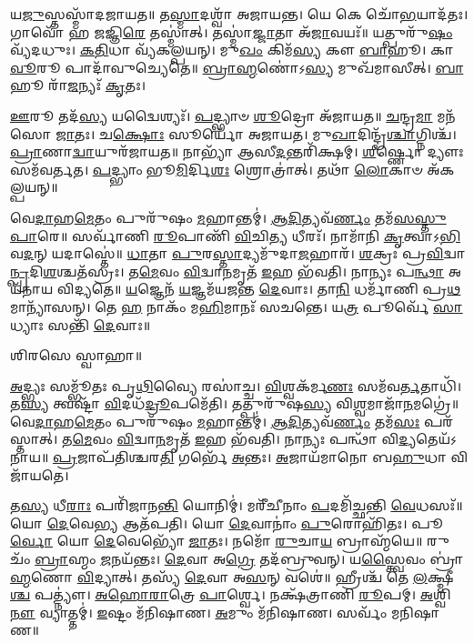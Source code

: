 𑌯\-\ul{𑌜𑍁}\-𑌸𑍍𑌤𑌸𑍍𑌮𑌾᳴𑌦𑌜𑌾𑌯𑌤॥ 𑌤\-\ul{𑌸𑍍𑌮𑌾}\-𑌦𑌶𑍍𑌵𑌾᳴ 𑌅𑌜𑌾𑌯𑌨𑍍𑌤। 𑌯𑍇 𑌕𑍇 𑌚𑍋᳴\-\ul{𑌭}\-𑌯𑌾𑌦᳴𑌤𑌃। 𑌗𑌾𑌵𑍋᳴ 𑌹 𑌜𑌜𑍍𑌞𑌿\-\ul{𑌰𑍇} 𑌤𑌸𑍍𑌮𑌾॑𑌤𑍍। 𑌤𑌸𑍍𑌮𑌾॑\-\ul{𑌜𑍍𑌜𑌾}\-𑌤𑌾 𑌅᳴\-\ul{𑌜𑌾}\-𑌵𑌯𑌃᳴॥ 𑌯𑌤𑍍𑌪𑍁𑌰𑍁᳴\-\ul{𑌷𑌂} 𑌵𑍍𑌯᳴𑌦𑌧𑍁𑌃। \ul{𑌕}\-\-\ul{𑌤𑌿}\-𑌧𑌾 𑌵𑍍𑌯᳴𑌕𑌲𑍍𑌪𑌯𑌨𑍍। 𑌮𑍁\-\ul{𑌖𑌂} 𑌕𑌿𑌮᳴\-\ul{𑌸𑍍𑌯} 𑌕𑍗 \ul{𑌬𑌾}\-𑌹𑍂। 𑌕𑌾\-\ul{𑌵𑍂}\-𑌰𑍂 𑌪𑌾𑌦𑌾᳴𑌵𑍁𑌚𑍍𑌯𑍇𑌤𑍇॥ \ul{𑌬𑍍𑌰𑌾}\-\-\ul{𑌹𑍍𑌮}\-𑌣𑍋॑𑌽\-\ul{𑌸𑍍𑌯} 𑌮𑍁𑌖᳴𑌮𑌾𑌸𑍀𑌤𑍍। \ul{𑌬𑌾}\-𑌹𑍂 𑌰𑌾᳴\-\ul{𑌜}\-𑌨𑍍𑌯𑌃᳴ \ul{𑌕𑍃}\-𑌤𑌃।

 \ul{𑌊}\-𑌰𑍂 𑌤𑌦᳴\-\ul{𑌸𑍍𑌯} 𑌯𑌦𑍍𑌵𑍈𑌶𑍍𑌯𑌃᳴। \ul{𑌪}\-𑌦𑍍𑌭𑍍𑌯𑌾𑍞 \ul{𑌶𑍂}\-𑌦𑍍𑌰𑍋 𑌅᳴𑌜𑌾𑌯𑌤॥ \ul{𑌚}\-𑌨𑍍𑌦𑍍𑌰\-\ul{𑌮𑌾} 𑌮𑌨᳴𑌸𑍋 \ul{𑌜𑌾}\-𑌤𑌃। 𑌚\-\ul{𑌕𑍍𑌷𑍋𑌃} 𑌸𑍂𑌰𑍍𑌯𑍋᳴ 𑌅𑌜𑌾𑌯𑌤। 𑌮𑍁\-\ul{𑌖𑌾}\-𑌦𑌿𑌨𑍍𑌦𑍍𑌰᳴\-\ul{𑌶𑍍𑌚𑌾}\-𑌗𑍍𑌨𑌿𑌶𑍍𑌚᳴। \ul{𑌪𑍍𑌰𑌾}\-𑌣𑌾\-\ul{𑌦𑍍𑌵𑌾}\-𑌯𑍁𑌰᳴𑌜𑌾𑌯𑌤॥ 𑌨𑌾𑌭𑍍𑌯𑌾᳴ 𑌆𑌸𑍀\-\ul{𑌦}\-𑌨𑍍𑌤𑌰𑌿᳴𑌕𑍍𑌷𑌮𑍍। \ul{𑌶𑍀}\-𑌰𑍍𑌷𑍍𑌣𑍋 𑌦𑍍𑌯𑍗𑌃 𑌸𑌮᳴𑌵𑌰𑍍𑌤𑌤। \ul{𑌪}\-𑌦𑍍𑌭𑍍𑌯𑌾𑌂 𑌭𑍂\-\ul{𑌮𑌿}\-𑌰𑍍𑌦𑌿\-\ul{𑌶𑌃} 𑌶𑍍𑌰𑍋𑌤𑍍𑌰𑌾॑𑌤𑍍। 𑌤𑌥𑌾᳴ \ul{𑌲𑍋}\-𑌕𑌾𑍞 𑌅᳴𑌕𑌲𑍍𑌪𑌯𑌨𑍍॥

 𑌵𑍇\-\ul{𑌦𑌾}\-𑌹\-\ul{𑌮𑍇}\-𑌤𑌂 𑌪𑍁𑌰𑍁᳴𑌷𑌂 \ul{𑌮}\-𑌹𑌾𑌨𑍍𑌤𑌮𑍍॑। \ul{𑌆}\-\-\ul{𑌦𑌿}\-𑌤𑍍𑌯𑌵᳴\-\ul{𑌰𑍍𑌣𑌂} 𑌤𑌮᳴\-\ul{𑌸}\-\-\ul{𑌸𑍍𑌤𑍁} \ul{𑌪𑌾}\-𑌰𑍇॥ 𑌸𑌰𑍍𑌵𑌾᳴𑌣𑌿 \ul{𑌰𑍂}\-𑌪𑌾𑌣𑌿᳴ \ul{𑌵𑌿}\-𑌚𑌿\-\ul{𑌤𑍍𑌯} 𑌧𑍀𑌰𑌃᳴। 𑌨𑌾𑌮𑌾᳴𑌨𑌿 \ul{𑌕𑍃}\-𑌤𑍍𑌵𑌾𑌽\-\ul{𑌭𑌿}\-𑌵\-\ul{𑌦}\-𑌨𑍍 𑌯𑌦𑌾𑌸𑍍𑌤𑍇॑॥ \ul{𑌧𑌾}\-𑌤𑌾 \ul{𑌪𑍁}\-𑌰\-\ul{𑌸𑍍𑌤𑌾}\-𑌦𑍍𑌯𑌮𑍁᳴𑌦𑌾\-\ul{𑌜}\-𑌹𑌾𑌰᳴। \ul{𑌶}\-𑌕𑍍𑌰𑌃 𑌪𑍍𑌰\-\ul{𑌵𑌿}\-𑌦𑍍𑌵𑌾\-\ul{𑌨𑍍𑌪𑍍𑌰}\-𑌦𑌿\-\ul{𑌶}\-𑌶𑍍𑌚𑌤᳴𑌸𑍍𑌰𑌃। 𑌤\-\ul{𑌮𑍇}\-𑌵𑌂 \ul{𑌵𑌿}\-𑌦𑍍𑌵𑌾\-\ul{𑌨}\-𑌮𑍃𑌤᳴ \ul{𑌇}\-𑌹 𑌭᳴𑌵𑌤𑌿। 𑌨𑌾𑌨𑍍𑌯𑌃 𑌪\-\ul{𑌨𑍍𑌥𑌾} 𑌅𑌯᳴𑌨𑌾𑌯 𑌵𑌿𑌦𑍍𑌯𑌤𑍇॥ \ul{𑌯}\-𑌜𑍍𑌞𑍇𑌨᳴ \ul{𑌯}\-𑌜𑍍𑌞𑌮᳴𑌯𑌜𑌨𑍍𑌤 \ul{𑌦𑍇}\-𑌵𑌾𑌃। 𑌤𑌾\-\ul{𑌨𑌿} 𑌧𑌰𑍍𑌮𑌾᳴𑌣𑌿 𑌪𑍍𑌰\-\ul{𑌥}\-𑌮𑌾𑌨𑍍𑌯𑌾᳴𑌸𑌨𑍍। 𑌤𑍇 \ul{𑌹} 𑌨𑌾𑌕𑌂᳴ 𑌮\-\ul{𑌹𑌿}\-𑌮𑌾𑌨𑌃᳴ 𑌸𑌚𑌨𑍍𑌤𑍇। 𑌯\-\ul{𑌤𑍍𑌰} 𑌪𑍂𑌰𑍍𑌵𑍇᳴ \ul{𑌸𑌾}\-𑌧𑍍𑌯𑌾𑌃 𑌸𑌨𑍍𑌤𑌿᳴ \ul{𑌦𑍇}\-𑌵𑌾𑌃॥ 

𑌶𑌿𑌰𑌸𑍇 𑌸𑍍𑌵𑌾𑌹𑌾॥

{\small \closesection}


\-\ul{𑌅}\-𑌦𑍍𑌭𑍍𑌯𑌃 𑌸𑌮𑍍𑌭𑍂᳴𑌤𑌃 𑌪𑍃\-\ul{𑌥𑌿}\-𑌵𑍍𑌯𑍈 𑌰𑌸𑌾॑𑌚𑍍𑌚। \ul{𑌵𑌿}\-𑌶𑍍𑌵𑌕᳴𑌰𑍍𑌮\-\ul{𑌣𑌃} 𑌸𑌮᳴𑌵\-\ul{𑌰𑍍𑌤}\-𑌤𑌾𑌧𑌿᳴। 𑌤\-\ul{𑌸𑍍𑌯} 𑌤𑍍𑌵𑌷𑍍𑌟𑌾᳴ \ul{𑌵𑌿}\-𑌦𑌧᳴\-\ul{𑌦𑍍𑌰𑍂}\-𑌪𑌮𑍇᳴𑌤𑌿। 𑌤𑌤𑍍𑌪𑍁𑌰𑍁᳴𑌷\-\ul{𑌸𑍍𑌯} 𑌵𑌿\-\ul{𑌶𑍍𑌵}\-𑌮𑌾𑌜𑌾᳴\-\ul{𑌨}\-𑌮𑌗𑍍𑌰𑍇॑॥ 𑌵𑍇\-\ul{𑌦𑌾}\-𑌹\-\ul{𑌮𑍇}\-𑌤𑌂 𑌪𑍁𑌰𑍁᳴𑌷𑌂 \ul{𑌮}\-𑌹𑌾𑌨𑍍𑌤𑌮𑍍॑। \ul{𑌆}\-\-\ul{𑌦𑌿}\-𑌤𑍍𑌯𑌵᳴\-\ul{𑌰𑍍𑌣𑌂} 𑌤𑌮᳴\-\ul{𑌸𑌃} 𑌪𑌰᳴𑌸𑍍𑌤𑌾𑌤𑍍। 𑌤\-\ul{𑌮𑍇}\-𑌵𑌂 \ul{𑌵𑌿}\-𑌦𑍍𑌵𑌾\-\ul{𑌨}\-𑌮𑍃𑌤᳴ \ul{𑌇}\-𑌹 𑌭᳴𑌵𑌤𑌿। 𑌨𑌾𑌨𑍍𑌯𑌃 𑌪𑌨𑍍𑌥𑌾᳴ 𑌵𑌿\-\ul{𑌦𑍍𑌯}\-𑌤𑍇𑌯᳴𑌽𑌨𑌾𑌯॥ \ul{𑌪𑍍𑌰}\-𑌜𑌾𑌪᳴𑌤𑌿𑌶𑍍𑌚𑌰\-\ul{𑌤𑌿} 𑌗𑌰𑍍𑌭𑍇᳴ \ul{𑌅}\-𑌨𑍍𑌤𑌃। \ul{𑌅}\-𑌜𑌾𑌯᳴𑌮𑌾𑌨𑍋 𑌬\-\ul{𑌹𑍁}\-𑌧𑌾 𑌵𑌿𑌜𑌾᳴𑌯𑌤𑍇। 

𑌤\-\ul{𑌸𑍍𑌯} 𑌧𑍀\-\ul{𑌰𑌾𑌃} 𑌪𑌰𑌿᳴𑌜𑌾𑌨\-\ul{𑌨𑍍𑌤𑌿} 𑌯𑍋𑌨𑌿𑌮𑍍॑। 𑌮𑌰𑍀᳴𑌚𑍀𑌨𑌾𑌂 \ul{𑌪}\-𑌦𑌮𑌿᳴𑌚𑍍𑌛𑌨𑍍𑌤𑌿 \ul{𑌵𑍇}\-𑌧𑌸𑌃᳴॥ 𑌯𑍋 \ul{𑌦𑍇}\-𑌵𑍇\-\ul{𑌭𑍍𑌯} 𑌆𑌤᳴𑌪𑌤𑌿। 𑌯𑍋 \ul{𑌦𑍇}\-𑌵𑌾𑌨𑌾𑌂॑ \ul{𑌪𑍁}\-𑌰𑍋𑌹𑌿᳴𑌤𑌃। 𑌪𑍂\-\ul{𑌰𑍍𑌵𑍋} 𑌯𑍋 \ul{𑌦𑍇}\-𑌵𑍇𑌭𑍍𑌯𑍋᳴ \ul{𑌜𑌾}\-𑌤𑌃। 𑌨𑌮𑍋᳴ \ul{𑌰𑍁}\-𑌚𑌾\-\ul{𑌯} 𑌬𑍍𑌰𑌾𑌹𑍍𑌮᳴𑌯𑍇॥ 𑌰𑍁𑌚𑌂᳴ \ul{𑌬𑍍𑌰𑌾}\-𑌹𑍍𑌮𑌂 \ul{𑌜}\-𑌨𑌯᳴𑌨𑍍𑌤𑌃। \ul{𑌦𑍇}\-𑌵𑌾 𑌅\-\ul{𑌗𑍍𑌰𑍇} 𑌤𑌦᳴𑌬𑍍𑌰𑍁𑌵𑌨𑍍। 𑌯\-\ul{𑌸𑍍𑌤𑍍𑌵𑍈}\-𑌵𑌂 𑌬𑍍𑌰𑌾॑\-\ul{𑌹𑍍𑌮}\-𑌣𑍋 \ul{𑌵𑌿}\-𑌦𑍍𑌯𑌾𑌤𑍍। 𑌤𑌸𑍍𑌯᳴ \ul{𑌦𑍇}\-𑌵𑌾 𑌅\-\ul{𑌸}\-𑌨𑍍 𑌵𑌶𑍇॑॥ 𑌹𑍍𑌰𑍀𑌶𑍍𑌚᳴ 𑌤𑍇 \ul{𑌲}\-𑌕𑍍𑌷𑍍𑌮𑍀\-\ul{𑌶𑍍𑌚} 𑌪𑌤𑍍𑌨𑍍𑌯𑍗॑। \ul{𑌅}\-\-\ul{𑌹𑍋}\-\-\ul{𑌰𑌾}\-𑌤𑍍𑌰𑍇 \ul{𑌪𑌾}\-𑌰𑍍𑌶𑍍𑌵𑍇। 𑌨𑌕𑍍𑌷᳴𑌤𑍍𑌰𑌾𑌣𑌿 \ul{𑌰𑍂}\-𑌪𑌮𑍍। \ul{𑌅}\-𑌶𑍍𑌵𑌿\-\ul{𑌨𑍗} 𑌵𑍍𑌯𑌾𑌤𑍍𑌤𑌮𑍍॑। \ul{𑌇}\-𑌷𑍍𑌟𑌂 𑌮᳴𑌨𑌿𑌷𑌾𑌣। \ul{𑌅}\-𑌮𑍁𑌂 𑌮᳴𑌨𑌿𑌷𑌾𑌣। 𑌸𑌰𑍍𑌵𑌂᳴ 𑌮𑌨𑌿𑌷𑌾𑌣॥ 

